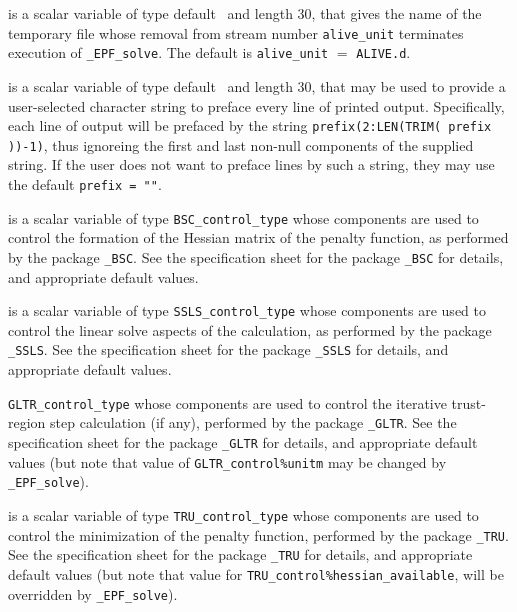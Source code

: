 \documentclass{galahad}
\newcommand{\packagename}{EPF}
\newcommand{\fullpackagename}{\libraryname\_\packagename}
\newcommand{\solver}{{\tt \fullpackagename\_solve}}
\begin{document}
\begin{description}
 is a scalar variable of type default \character\ and length
30, that gives the name of the temporary file whose removal from stream number
{\tt alive\_unit} terminates execution of \solver.
The default is {\tt alive\_unit} $=$ {\tt ALIVE.d}.

 is a scalar variable of type default \character\
and length 30, that may be used to provide a user-selected
character string to preface every line of printed output.
Specifically, each line of output will be prefaced by the string
{\tt prefix(2:LEN(TRIM( prefix ))-1)},
thus ignoreing the first and last non-null components of the
supplied string. If the user does not want to preface lines by such
a string, they may use the default {\tt prefix = ""}.

 is a scalar variable of type
{\tt BSC\_control\_type}
whose components are used to control the formation of the Hessian matrix
of the penalty function, as performed by the package
{\tt \libraryname\_BSC}.
See the specification sheet for the package
{\tt \libraryname\_BSC}
for details, and appropriate default values.

 is a scalar variable of type
{\tt SSLS\_control\_type}
whose components are used to control the linear solve
aspects of the calculation, as performed by the package
{\tt \libraryname\_SSLS}.
See the specification sheet for the package
{\tt \libraryname\_SSLS}
for details, and appropriate default values.

{\tt GLTR\_control\_type}
whose components are used to control the
iterative trust-region step calculation (if any),
performed by the package
{\tt \libraryname\_GLTR}.
See the specification sheet for the package
{\tt \libraryname\_GLTR}
for details, and appropriate default values
(but note that value of
{\tt GLTR\_control\%unitm}
may be changed by \solver).

 is a scalar variable of type
{\tt TRU\_control\_type}
whose components are used to control the
minimization of the penalty function,
performed by the package
{\tt \libraryname\_TRU}.
See the specification sheet for the package
{\tt \libraryname\_TRU}
for details, and appropriate default values
(but note that value for
{\tt TRU\_control\%hessian\_available},
will be overridden by \solver).

\end{description}

\end{document}
